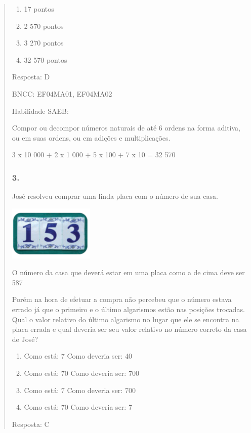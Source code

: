 \begin{enumerate}
\begin{escolha}
\begin{enumerate}
\begin{itemize}
\begin{itemize}
\begin{escolha}
\begin{quote}
\begin{escolha}
{\begin{enumerate}
\def\labelenumi{\alph{enumi})}
\item
  17 pontos
\item
  2 570 pontos
\item
  3 270 pontos
\item
  32 570 pontos
\end{enumerate}

Resposta: D

BNCC: EF04MA01, EF04MA02

Habilidade SAEB:

Compor ou decompor números naturais de até 6 ordens na forma aditiva, ou
em suas ordens, ou em adições e multiplicações.

3 x 10 000 + 2 x 1 000 + 5 x 100 + 7 x 10 = 32 570

\subsubsection{3.}\label{section-145}

José resolveu comprar uma linda placa com o número de sua casa.

\includegraphics[width=1.60256in,height=1.03072in]{media/image143.png}

O número da casa que deverá estar em uma placa como a de cima deve ser
587

Porém na hora de efetuar a compra não percebeu que o número estava
errado já que o primeiro e o último algarismos estão nas posições
trocadas. Qual o valor relativo do último algarismo no lugar que ele se
encontra na placa errada e qual deveria ser seu valor relativo no número
correto da casa de José?

\begin{enumerate}
\def\labelenumi{\alph{enumi})}
\item
  Como está: 7 Como deveria ser: 40
\item
  Como está: 70 Como deveria ser: 700
\item
  Como está: 7 Como deveria ser: 700
\item
  Como está: 70 Como deveria ser: 7
\end{enumerate}

Resposta: C

}
\end{escolha}
\end{quote}
\end{escolha}
\end{itemize}
\end{itemize}
\end{enumerate}
\end{escolha}
\end{enumerate}
